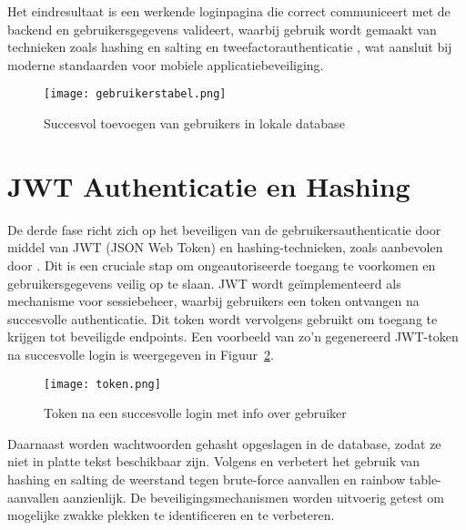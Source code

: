 Het eindresultaat is een werkende loginpagina die correct communiceert met de backend en gebruikersgegevens valideert, waarbij gebruik wordt gemaakt van technieken zoals hashing en salting \autocite{Arias2025} en tweefactorauthenticatie \autocite{Jurisons2024}, wat aansluit bij moderne standaarden voor mobiele applicatiebeveiliging. \\

\begin{figure}[H]
	\centering
	\texttt{[image: gebruikerstabel.png]}
	\caption{Succesvol toevoegen van gebruikers in lokale database}
	\label{fig:gebruikerstabel}
\end{figure}

\section{JWT Authenticatie en Hashing}

De derde fase richt zich op het beveiligen van de gebruikersauthenticatie door middel van JWT (JSON Web Token) en hashing-technieken, zoals aanbevolen door \textcite{Gao2023}. Dit is een cruciale stap om ongeautoriseerde toegang te voorkomen en gebruikersgegevens veilig op te slaan. JWT wordt geïmplementeerd als mechanisme voor sessiebeheer, waarbij gebruikers een token ontvangen na succesvolle authenticatie. Dit token wordt vervolgens gebruikt om toegang te krijgen tot beveiligde endpoints. Een voorbeeld van zo’n gegenereerd JWT-token na succesvolle login is weergegeven in Figuur~\ref{fig:token}. \\

\begin{figure}[H]
	\centering
	\texttt{[image: token.png]}
	\caption{Token na een succesvolle login met info over gebruiker}
	\label{fig:token}
\end{figure}

Daarnaast worden wachtwoorden gehasht opgeslagen in de database, zodat ze niet in platte tekst beschikbaar zijn. Volgens \textcite{Gupta2022} en \textcite{Arias2025} verbetert het gebruik van hashing en salting de weerstand tegen brute-force aanvallen en rainbow table-aanvallen aanzienlijk. De beveiligingsmechanismen worden uitvoerig getest om mogelijke zwakke plekken te identificeren en te verbeteren. \\

